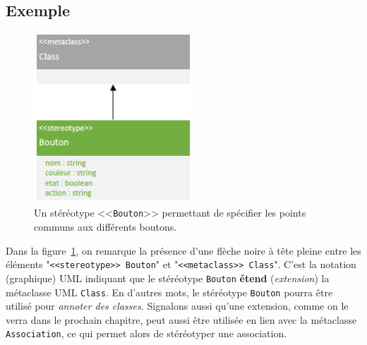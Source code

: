 \subsection*{Exemple}
%
\begin{figure}
    \begin{center}
    \includegraphics[width=6cm]{10_img/chap4/button.PNG}
    \caption[Un st\'er\'eotype <<\texttt{Bouton}>>.]{Un st\'er\'eotype <<\texttt{Bouton}>> permettant de sp\'ecifier les points communs aux diff\'erents boutons.}
    \label{fig.uml_but_definition}
    \end{center}
\end{figure}

Dans la figure~\ref{fig.uml_but_definition}, on remarque la présence d'une flèche noire à tête pleine entre les éléments "\texttt{<<stereotype>> Bouton}" et "\texttt{<<metaclass>>~Class}".
C'est la notation (graphique) UML indiquant que le st\'er\'eotype \texttt{Bouton} \textbf{étend} (\emph{extension}) la métaclasse UML \texttt{Class}.
%
En d'autres mots, le stéréotype \texttt{Bouton} pourra être utilisé pour \emph{annoter des classes.}
%
Signalons aussi qu'une extension, comme on le verra dans le prochain chapitre, peut aussi être utilisée en lien avec la métaclasse \texttt{Association}, ce qui permet alors de stéréotyper une association.

